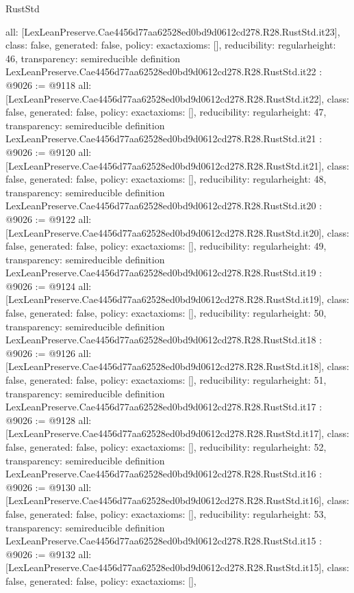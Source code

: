 \begin{lexlean}{RustStd}
\begin{coremodule}
{  all: [LexLeanPreserve.Cae4456d77aa62528ed0bd9d0612cd278.R28.RustStd.it23],
  class: false,
  generated: false,
  policy: exact{axioms: []},
  reducibility: regular{height: 46},
  transparency: semireducible
}
definition LexLeanPreserve.Cae4456d77aa62528ed0bd9d0612cd278.R28.RustStd.it22 : @9026 := @9118 {
  all: [LexLeanPreserve.Cae4456d77aa62528ed0bd9d0612cd278.R28.RustStd.it22],
  class: false,
  generated: false,
  policy: exact{axioms: []},
  reducibility: regular{height: 47},
  transparency: semireducible
}
definition LexLeanPreserve.Cae4456d77aa62528ed0bd9d0612cd278.R28.RustStd.it21 : @9026 := @9120 {
  all: [LexLeanPreserve.Cae4456d77aa62528ed0bd9d0612cd278.R28.RustStd.it21],
  class: false,
  generated: false,
  policy: exact{axioms: []},
  reducibility: regular{height: 48},
  transparency: semireducible
}
definition LexLeanPreserve.Cae4456d77aa62528ed0bd9d0612cd278.R28.RustStd.it20 : @9026 := @9122 {
  all: [LexLeanPreserve.Cae4456d77aa62528ed0bd9d0612cd278.R28.RustStd.it20],
  class: false,
  generated: false,
  policy: exact{axioms: []},
  reducibility: regular{height: 49},
  transparency: semireducible
}
definition LexLeanPreserve.Cae4456d77aa62528ed0bd9d0612cd278.R28.RustStd.it19 : @9026 := @9124 {
  all: [LexLeanPreserve.Cae4456d77aa62528ed0bd9d0612cd278.R28.RustStd.it19],
  class: false,
  generated: false,
  policy: exact{axioms: []},
  reducibility: regular{height: 50},
  transparency: semireducible
}
definition LexLeanPreserve.Cae4456d77aa62528ed0bd9d0612cd278.R28.RustStd.it18 : @9026 := @9126 {
  all: [LexLeanPreserve.Cae4456d77aa62528ed0bd9d0612cd278.R28.RustStd.it18],
  class: false,
  generated: false,
  policy: exact{axioms: []},
  reducibility: regular{height: 51},
  transparency: semireducible
}
definition LexLeanPreserve.Cae4456d77aa62528ed0bd9d0612cd278.R28.RustStd.it17 : @9026 := @9128 {
  all: [LexLeanPreserve.Cae4456d77aa62528ed0bd9d0612cd278.R28.RustStd.it17],
  class: false,
  generated: false,
  policy: exact{axioms: []},
  reducibility: regular{height: 52},
  transparency: semireducible
}
definition LexLeanPreserve.Cae4456d77aa62528ed0bd9d0612cd278.R28.RustStd.it16 : @9026 := @9130 {
  all: [LexLeanPreserve.Cae4456d77aa62528ed0bd9d0612cd278.R28.RustStd.it16],
  class: false,
  generated: false,
  policy: exact{axioms: []},
  reducibility: regular{height: 53},
  transparency: semireducible
}
definition LexLeanPreserve.Cae4456d77aa62528ed0bd9d0612cd278.R28.RustStd.it15 : @9026 := @9132 {
  all: [LexLeanPreserve.Cae4456d77aa62528ed0bd9d0612cd278.R28.RustStd.it15],
  class: false,
  generated: false,
  policy: exact{axioms: []},
}
\end{coremodule}
\end{lexlean}
